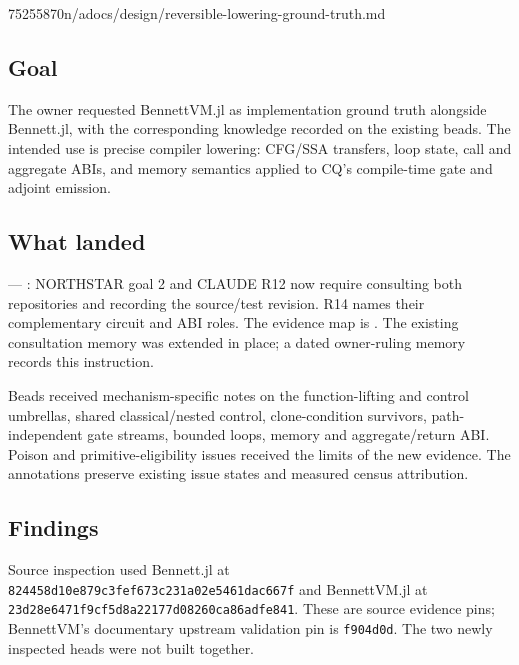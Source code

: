 %
  {75255870}{n/a}{docs/design/reversible-lowering-ground-truth.md}

\subsection*{Goal}
The owner requested BennettVM.jl as implementation ground truth alongside
Bennett.jl, with the corresponding knowledge recorded on the existing beads.
The intended use is precise compiler lowering: CFG/SSA transfers, loop state,
call and aggregate ABIs, and memory semantics applied to CQ's compile-time
gate and adjoint emission.

\subsection*{What landed}
 --- : NORTHSTAR goal 2 and CLAUDE R12 now require
consulting both repositories and recording the source/test revision. R14 names
their complementary circuit and ABI roles. The evidence map is
.
The existing consultation memory was extended in place; a dated owner-ruling
memory records this instruction.

Beads received mechanism-specific notes on the function-lifting and control
umbrellas, shared classical/nested control, clone-condition survivors,
path-independent gate streams, bounded loops, memory and aggregate/return ABI.
Poison and primitive-eligibility issues received the limits of the new evidence.
The annotations preserve existing issue states and measured census attribution.

\subsection*{Findings}
Source inspection used Bennett.jl at
\texttt{824458d10e879c3fef673c231a02e5461dac667f} and BennettVM.jl at
\texttt{23d28e6471f9cf5d8a22177d08260ca86adfe841}. These are source evidence
pins; BennettVM's documentary upstream validation pin is \texttt{f904d0d}.
The two newly inspected heads were not built together.

